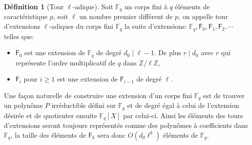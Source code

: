 \documentclass[10pt,a4paper]{book}
\theoremstyle{plain}
\theoremstyle{definition}
\theoremstyle{definition}
\theoremstyle{definition}
\theoremstyle{definition}
\newtheorem{defi}[thm]{Définition}
\theoremstyle{remark}
\theoremstyle{remark}
\theoremstyle{definition}
\begin{document}
\begin{defi}[Tour \textit{$\ell$}-adique]
\label{def:tour-ell}
Soit $\mathbb{F}_q$ un corps fini à $q$ éléments de caractéristique $p$, soit $\ell$ un nombre premier différent de $p$, on appelle tour d'extensions $\ell$-adiques du corps fini $\mathbb{F}_q$ la suite d'extensions: $\mathbb{F}_q, \mathsf{F}_{0}, \mathsf{F}_{1}, \mathsf{F}_{2}, \cdots$ telles que:
\begin{itemize}
\item $\mathsf{F}_{0}$ est une extension de $\mathbb{F}_q$ de degré $d_0 \mid \ell-1$. De plus $r \mid d_0$ avec $r$ qui représente l'ordre multiplicatif de $q$ dans $\mathbb{Z}/\ell \mathbb{Z}$,
\item $\mathsf{F}_{i}$ pour $i \geqslant 1$ est une extension de $\mathsf{F}_{i-1}$ de degré $\ell$.
\end{itemize}
\end{defi}

Une façon naturelle de  construire une extension d'un corps fini $\mathbb{F}_q$ est de trouver un polynôme $P$ irréductible défini sur $\mathbb{F}_q$ et de degré égal à celui de l'extension désirée et de quotienter ensuite $\mathbb{F}_q[X]$ par celui-ci.
Ainsi les éléments des tours d'extensions seront toujours représentés comme des polynômes à coefficients dans $\mathbb{F}_q$, la taille des éléments de $\mathsf{F}_{k}$ sera donc $O(d_0\ell^k)$ éléments de $\mathbb{F}_q$. 
\end{document}
